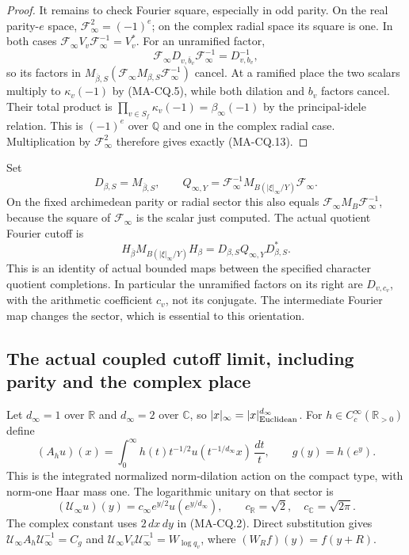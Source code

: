 \begin{proof}
It remains to check Fourier square, especially
in odd parity.
On the real parity-$e$ space,
$\mathcal F_\infty^2=(-1)^e$; on the complex
radial space its square is one.
In both cases
$\mathcal F_\infty V_v\mathcal F_\infty^{-1}
        =V_v^*$.
For an unramified factor,
\[
 \mathcal F_\infty D_{v,\overline b_v}
                  \mathcal F_\infty^{-1}=D_{v,b_v}^{-1},
\]
so its factors in
$M_{\overline\beta,S}
 (\mathcal F_\infty M_{\beta,S}
                         \mathcal F_\infty^{-1})$
cancel.  At a ramified place the two scalars
multiply to $\kappa_v(-1)$ by (MA-CQ.5),
while both dilation and $b_v$ factors cancel.
Their total product is
$\prod_{v\in S_f}\kappa_v(-1)=\beta_\infty(-1)$
by the principal-idele relation.
This is $(-1)^e$ over $\mathbb Q$ and one in
the complex radial case.  Multiplication by
$\mathcal F_\infty^2$ therefore gives exactly
(MA-CQ.13).
\end{proof}

Set
\[
       D_{\beta,S}=M_{\overline\beta,S},
 \qquad Q_{\infty,Y}
    =\mathcal F_\infty^{-1}
          M_{B(|\xi|_\infty/Y)}\mathcal F_\infty .
\tag{MA-CQ.16}
\]
On the fixed archimedean parity or radial sector this also
equals $\mathcal F_\infty M_B\mathcal F_\infty^{-1}$,
because the square of $\mathcal F_\infty$ is the scalar
just computed.  The actual quotient Fourier cutoff is
\[
 H_{\overline\beta}M_{B(|\xi|_\infty/Y)}H_\beta
                  =D_{\beta,S}Q_{\infty,Y}D_{\beta,S}^* .
\tag{MA-CQ.17}
\]
This is an identity of actual bounded maps between the
specified character quotient completions.  In particular
the unramified factors on its right are $D_{v,c_v}$,
with the arithmetic coefficient $c_v$, not its
conjugate.  The intermediate Fourier map changes the
sector, which is essential to this orientation.

\subsection{The actual coupled cutoff limit, including parity and the complex place}

Let $d_\infty=1$ over $\mathbb R$ and $d_\infty=2$
over $\mathbb C$, so $|x|_\infty=|x|_{\rm Euclidean}^{d_\infty}$.
For $h\in C_c^\infty(\mathbb R_{>0})$ define
\[
 (A_hu)(x)
    =\int_0^\infty h(t)t^{-1/2}
                 u(t^{-1/d_\infty}x)\,\frac{dt}{t},
                  \qquad g(y)=h(e^y).
\tag{MA-CQ.18}
\]
This is the integrated normalized norm-dilation action
on the compact type, with norm-one Haar mass one.
The logarithmic unitary on that sector is
\[
 (\mathscr U_\infty u)(y)
   =c_\infty e^{y/2}u(e^{y/d_\infty}),
 \qquad c_{\mathbb R}=\sqrt2,\quad
                         c_{\mathbb C}=\sqrt{2\pi}.
\tag{MA-CQ.19}
\]
The complex constant uses $2\,dx\,dy$ in (MA-CQ.2).
Direct substitution gives
$\mathscr U_\infty A_h\mathscr U_\infty^{-1}=C_g$
and $\mathscr U_\infty V_v\mathscr U_\infty^{-1}
       =W_{\log q_v}$, where $(W_Rf)(y)=f(y+R)$.

